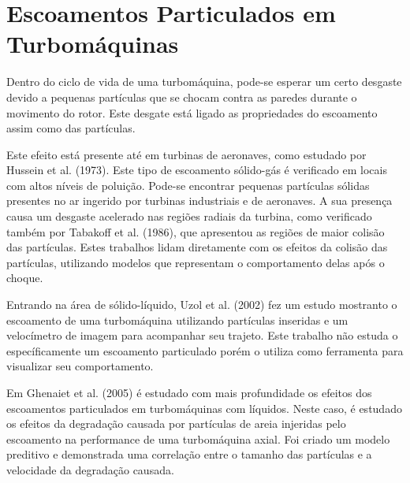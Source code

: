 \section{\textbf{Escoamentos Particulados em Turbomáquinas}}
Dentro do ciclo de vida de uma turbomáquina, pode-se esperar um certo desgaste devido a pequenas partículas que se chocam contra as paredes durante o movimento do rotor.
Este desgate está ligado as propriedades do escoamento assim como das partículas.

Este efeito está presente até em turbinas de aeronaves, como estudado por Hussein et al. (1973)\cite{Hussein-1973}.
Este tipo de escoamento sólido-gás é verificado em locais com altos níveis de poluição.
Pode-se encontrar pequenas partículas sólidas presentes no ar ingerido por turbinas industriais e de aeronaves.
A sua presença causa um desgaste acelerado nas regiões radiais da turbina, como verificado também por Tabakoff et al. (1986)\cite{Tabakoff-1986}, que apresentou as regiões de maior colisão das partículas.
Estes trabalhos lidam diretamente com os efeitos da colisão das partículas, utilizando modelos que representam o comportamento delas após o choque.

Entrando na área de sólido-líquido, Uzol et al. (2002)\cite{Uzol-2002} fez um estudo mostranto o escoamento de uma turbomáquina utilizando partículas inseridas e um velocímetro de imagem para acompanhar seu trajeto.
Este trabalho não estuda o específicamente um escoamento particulado porém o utiliza como ferramenta para visualizar seu comportamento.

Em Ghenaiet et al. (2005)\cite{Ghenaiet-2005} é estudado com mais profundidade os efeitos dos escoamentos particulados em turbomáquinas com líquidos.
Neste caso, é estudado os efeitos da degradação causada por partículas de areia injeridas pelo escoamento na performance de uma turbomáquina axial.
Foi criado um modelo preditivo e demonstrada uma correlação entre o tamanho das partículas e a velocidade da degradação causada.

